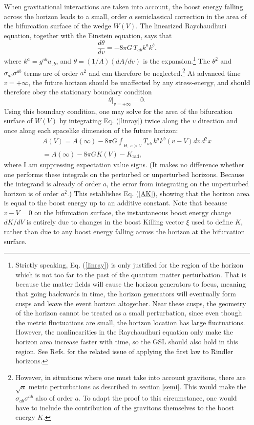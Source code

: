 \documentclass[12pt]{article}
\begin{document}
When gravitational interactions are taken into account, the boost energy falling across the horizon leads to a small, order $a$ semiclassical correction in the area of the bifurcation surface of the wedge $W(V)$.  The linearized Raychaudhuri equation, together with the Einstein equation, says that
\begin{equation}\label{linray}
\frac{d \theta }{dv} = -8\pi G\,T_{ab} k^a k^b.
\end{equation}
where $k^a = g^{ab} u_{,b}$, and $\theta = (1/A)(dA/dv)$ is the expansion.\footnote{Strictly speaking, Eq. (\ref{linray}) is only justified for the region of the horizon which is not too far to the past of the quantum matter perturbation.  That is because the matter fields will cause the horizon generators to focus, meaning that going backwards in time, the horizon generators will eventually form cusps and leave the event horizon altogether.  Near these cusps, the geometry of the horizon cannot be treated as a small perturbation, since even though the metric fluctuations are small, the horizon location has large fluctuations.  However, the nonlinearities in the Raychaudhuri equation only make the horizon area increase faster with time, so the GSL should also hold in this region.  See Refs. \cite{JP07}\cite{AMV08} for the related issue of applying the first law to Rindler horizons.}  The $\theta^2$ and $\sigma_{ab}\sigma^{ab}$ terms are of order $a^2$ and can therefore be neglected.\footnote{However, in situations where one must take into account gravitons, there are $\sqrt{a}$ metric perturbations as described in section \ref{semi}.  This would make the $\sigma_{ab}\sigma^{ab}$ also of order $a$.  To adapt the proof to this circumstance, one would have to include the contribution of the gravitons themselves to the boost energy $K$.}  At advanced time $v = +\infty$, the future horizon should be unaffected by any stress-energy, and should therefore obey the stationary boundary condition
\begin{equation}
\theta|_{v=+\infty} = 0.
\end{equation}
Using this boundary condition, one may solve for the area of the bifurcation surface of $W(V)$ by integrating Eq. (\ref{linray}) twice along the $v$ direction and once along each spacelike dimension of the future horizon:
\begin{eqnarray}
A(V)= A(\infty) - 8\pi G \int_{H;\,v > V} T_{ab} \, k^a k^b (v - V) dv\,d^2x \\
= A(\infty) - 8\pi G K(V) - K_\mathrm{rad},
\end{eqnarray}
where I am suppressing expectation value signs.  (It makes no difference whether one performs these integrals on the perturbed or unperturbed horizons.  Because the integrand is already of order $a$, the error from integrating on the unperturbed horizon is of order $a^2$.)  This establishes Eq. (\ref{AK}), showing that the horizon area is equal to the boost energy up to an additive constant.  Note that because $v - V = 0$ on the bifurcation surface, the instantaneous boost energy change $dK/dV$ is entirely due to changes in the boost Killing vector $\xi$ used to define $K$, rather than due to any boost energy falling across the horizon at the bifurcation surface.
\end{document}
